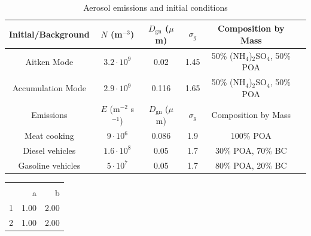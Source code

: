 \documentclass{article}
\begin{document}
\begin{table}[h!]
\centering
\caption{Aerosol emissions and initial conditions}
\begin{tabular*}{\linewidth}{@{\extracolsep{\fill}} cccccc}
\toprule
 Initial/Background  & $N$ (m$^{-3}$) & $D_{\text{gn}}$ ($\mu$m) & $\sigma_g$ & Composition by Mass\\
 \midrule
Aitken Mode & $3.2 \cdot 10^9$ & 0.02 & 1.45 & 50\% (NH$_4$)$_2$SO$_4$, 50\% POA\\
Accumulation Mode & $2.9 \cdot 10^9$ & 0.116 & 1.65 & 50\% (NH$_4$)$_2$SO$_4$, 50\% POA\\
\midrule
Emissions & $E$ (m$^{-2}$ s$^{-1}$) & $D_{\text{gn}}$ ($\mu$m) & $\sigma_g$ & Composition by Mass\\
\midrule
Meat cooking & $9 \cdot 10^6$ & 0.086 & 1.9 & 100\% POA\\
Diesel vehicles & $1.6 \cdot 10^8$ & 0.05 & 1.7 & 30\% POA, 70\% BC \\
Gasoline vehicles & $5 \cdot 10^7$ & 0.05 & 1.7 & 80\% POA, 20\% BC \\
\bottomrule
\end{tabular*}
\end{table}

\begin{table}[ht]
\centering
\begin{tabular}{rrr}
  \\[-2ex]\hline 
     \hline \\[-2ex] & a & b \\ 
  \hline
1 & 1.00 & 2.00 \\ 
   \hline
2 & 1.00 & 2.00 \\ 
   \hline
\end{tabular}
\end{table}
\end{document}
